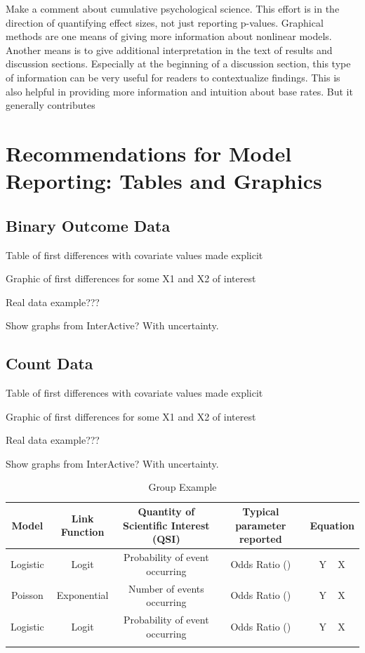 \documentclass[jou, apacite]{apa6}
\begin{document}
Make a comment about cumulative psychological science. This effort is in the direction of quantifying effect sizes, not just reporting p-values. Graphical methods are one means of giving more information about nonlinear models. Another means is to give additional interpretation in the text of results and discussion sections. Especially at the beginning of a discussion section, this type of information can be very useful for readers to contextualize findings. This is also helpful in providing more information and intuition about base rates. But it generally contributes 

\section{Recommendations for Model Reporting: Tables and Graphics}
\subsection{Binary Outcome Data}
Table of first differences with covariate values made explicit

Graphic of first differences for some X1 and X2 of interest	

Real data example???

Show graphs from InterActive? With uncertainty.

\subsection{Count Data}
Table of first differences with covariate values made explicit

Graphic of first differences for some X1 and X2 of interest

Real data example???

Show graphs from InterActive? With uncertainty.


\begin{table}[htp]
\centering
\addtolength{\tabcolsep}{3pt} %

\caption{Group Example}

\begin{tabular}{| c | c | c| c | c |}
\toprule
Model & Link Function & Quantity of Scientific Interest (QSI) & Typical parameter reported & Equation\\
\midrule
Logistic & Logit & Probability of event occurring & Odds Ratio () & Y ~ X \\
Poisson & Exponential & Number of events occurring& Odds Ratio () & Y ~ X \\
Logistic & Logit & Probability of event occurring & Odds Ratio () & Y ~ X \\
\addlinespace
\midrule[\heavyrulewidth]
\end{tabular}

\end{table}
\end{document}

